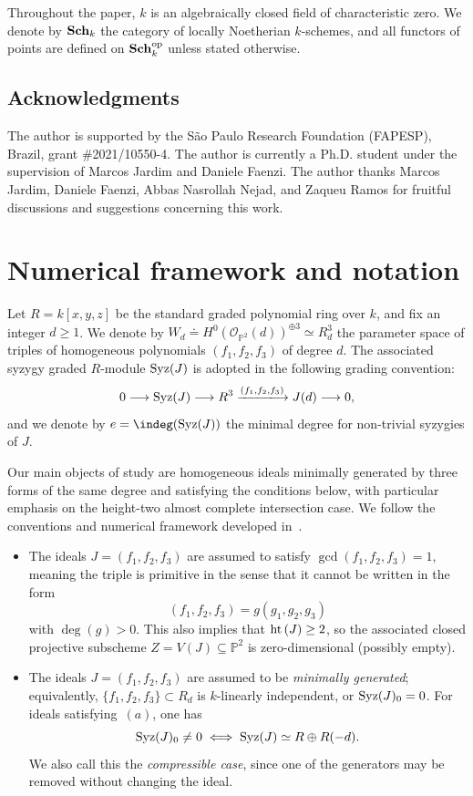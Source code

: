 \documentclass[11pt]{amsart} %
\newcommand{\lar}{\longrightarrow}
\theoremstyle{definition}
\def\hht{{\rm ht}\,}
\def\syz{\mbox{\rm Syz}}
\def\hht{{\rm ht}\,}
\def\Sch{{\bf Sch}}
\begin{document}
Throughout the paper, $k$ is an algebraically closed field of
characteristic zero. We denote by $\Sch_k$ the category of locally
Noetherian $k$-schemes, and all functors of points are defined on
$\Sch_k^{\mathrm{op}}$ unless stated otherwise.
        
\subsection*{Acknowledgments}
The author is supported by the S\~ao Paulo Research Foundation
(FAPESP), Brazil, grant \#2021/10550-4. The author is currently a
Ph.D. student under the supervision of Marcos Jardim and Daniele
Faenzi. The author thanks Marcos Jardim, Daniele Faenzi,
Abbas Nasrollah Nejad, and Zaqueu Ramos for fruitful discussions and
suggestions concerning this work.

\section{Numerical framework and notation}\label{sec:framework}

Let $R=k[x,y,z]$ be the standard graded polynomial ring over $k$, and fix an integer $d\geq 1$. We denote by $
W_d \doteq H^0(\mathcal{O}_{\mathbb{P}^2}(d))^{\oplus 3} \simeq R_d^3$ the parameter space of triples of homogeneous polynomials $(f_1, f_2, f_3)$ of degree $d$. The associated  syzygy graded $R$-module $\syz(J)$ is adopted in the following grading convention:
$$
0 \lar \syz(J) \lar R^3 \xlongrightarrow{(f_1, f_2, f_3)} J(d) \lar 0,
$$
and we denote by $e = \indeg(\syz(J))$ the minimal degree for non-trivial syzygies of $J$.

Our main objects of study are homogeneous ideals minimally generated
by three forms of the same degree and satisfying the conditions
below, with particular emphasis on the height-two almost complete
intersection case. We follow the conventions and numerical framework
developed in~\cite{JMNRS2026}.

\begin{itemize}
    \item[(a)] The ideals $J = (f_1, f_2, f_3)$ are assumed to satisfy $\gcd(f_1, f_2, f_3) = 1$, meaning the triple is primitive in the sense that it cannot be written in the form
    $$
    (f_1, f_2, f_3) = g(g_1, g_2, g_3)
    $$ with $\deg(g) > 0$. This also implies that $\hht(J) \geq 2$, so the associated closed projective subscheme $Z = V(J) \subseteq \mathbb{P}^2$ is zero-dimensional (possibly empty).
    \item[(b)] The ideals $J=(f_1,f_2,f_3)$ are assumed to be \emph{minimally generated}; equivalently, $\{f_1,f_2,f_3\}\subset R_d$ is $k$-linearly independent, or $\syz(J)_0=0$. For ideals satisfying~$(a)$, one has
    $$
    \syz(J)_0 \neq 0 \iff \syz(J) \simeq R \oplus R(-d).
    $$
    We also call this the \emph{compressible case}, since one of the generators may be removed without changing the ideal.
\end{itemize}
\end{document}
